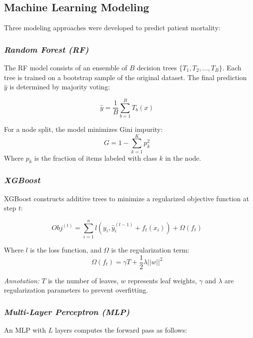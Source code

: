 \documentclass[
  journal=medium,
  manuscript=article-type,
  year=2026,
  volume=37,
]{cup-journal}
\begin{document}
\subsection{Machine Learning Modeling}
Three modeling approaches were developed to predict patient mortality:

\subsubsection*{\textbf{\textit{Random Forest (RF)}}}
The RF model consists of an ensemble of $B$ decision trees $\{T_1, T_2, \dots, T_B\}$. Each tree is trained on a bootstrap sample of the original dataset. The final prediction $\hat{y}$ is determined by majority voting:

\begin{equation}
    \hat{y} = \frac{1}{B} \sum_{b=1}^{B} T_b(x)
\end{equation}

For a node split, the model minimizes Gini impurity:
\begin{equation}
    G = 1 - \sum_{k=1}^{K} p_k^2
\end{equation}
Where $p_k$ is the fraction of items labeled with class $k$ in the node.

\subsubsection*{\textbf{\textit{XGBoost}}}
XGBoost constructs additive trees to minimize a regularized objective function at step $t$:

\begin{equation}
    Obj^{(t)} = \sum_{i=1}^n l(y_i, \hat{y}_i^{(t-1)} + f_t(x_i)) + \Omega(f_t)
\end{equation}

Where $l$ is the loss function, and $\Omega$ is the regularization term:
\begin{equation}
    \Omega(f_t) = \gamma T + \frac{1}{2} \lambda ||w||^2
\end{equation}

\textit{Annotation:} $T$ is the number of leaves, $w$ represents leaf weights, $\gamma$ and $\lambda$ are regularization parameters to prevent overfitting.

\subsubsection*{\textbf{\textit{Multi-Layer Perceptron (MLP)}}}
An MLP with $L$ layers computes the forward pass as follows:
\end{document}

